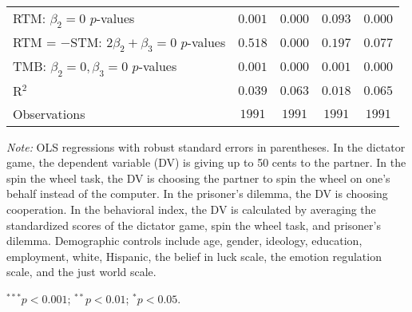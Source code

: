 \begin{table}[!t]
\begin{center}
{\begin{threeparttable}
\begin{tabular}{l c c c c}
RTM: $\beta_2 = 0$ $p$-values                    & $0.001$        & $0.000$        & $0.093$        & $0.000$        \\
RTM = $-$STM: $2 \beta_2+\beta_3 = 0$ $p$-values & $0.518$        & $0.000$        & $0.197$        & $0.077$        \\
TMB: $\beta_2 = 0, \beta_3 = 0$ $p$-values       & $0.001$        & $0.000$        & $0.001$        & $0.000$        \\
R$^2$                                            & $0.039$        & $0.063$        & $0.018$        & $0.065$        \\
Observations                                     & $1991$         & $1991$         & $1991$         & $1991$         \\
\bottomrule
\end{tabular}
\begin{tablenotes}[flushleft]
\scriptsize{\item[\hspace{-5mm}] \textit{Note:} OLS regressions with robust standard errors in parentheses. 
                                In the dictator game, the dependent variable (DV) is giving up to 50 cents to the partner. 
                                In the spin the wheel task, the DV is choosing the partner to spin the wheel on one’s behalf instead of the computer. 
                                In the prisoner’s dilemma, the DV is choosing cooperation. 
                                In the behavioral index, the DV is calculated by averaging the standardized scores of the dictator game, spin the wheel task, and prisoner's dilemma.
                                Demographic controls include age, gender, ideology,
                                education, employment, white, Hispanic, the belief in luck scale, the emotion regulation scale, and the just world scale. \item[\hspace{-5mm}] $^{***}p<0.001$; $^{**}p<0.01$; $^{*}p<0.05$.}
\end{tablenotes}
\end{threeparttable}
}
\label{tab:behavior_regression_demographic}
\end{center}
\end{table}

\renewcommand{\baselinestretch}{1.67}%
